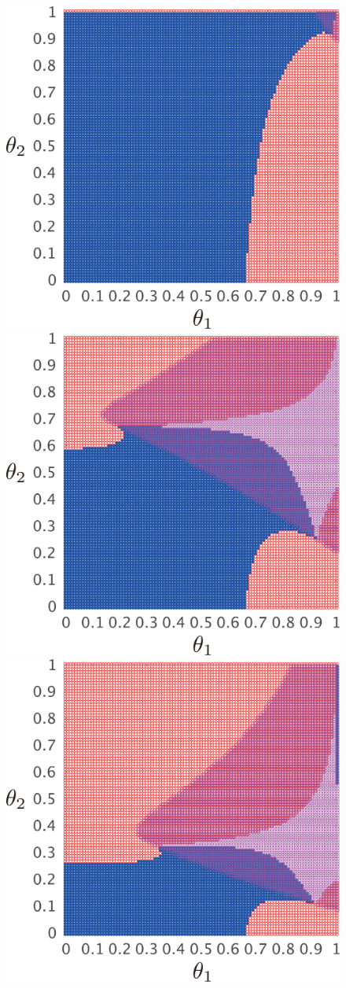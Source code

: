 \documentclass[tombow,dvipdfmx]{corona-a5-1.1}
\begin{document}
\begin{figure}[t]
  \centering
  {
  \begin{minipage}{0.49\linewidth}
    \centering
    \includegraphics[width = .8\linewidth]{figs/gam01thm}
    \medskip
  \end{minipage}
  \begin{minipage}{0.49\linewidth}
    \centering
    \includegraphics[width = .8\linewidth]{figs/gam2thm}
    \medskip
  \end{minipage}
    \centering
    \includegraphics[width = .4\linewidth]{figs/gam5thm}
}
\end{figure}
\end{document}
